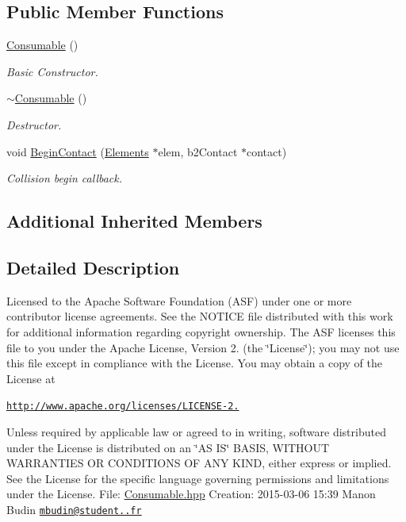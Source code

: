 \subsection*{Public Member Functions}
\begin{DoxyCompactItemize}
\item 
\hyperlink{class_consumable_ae374944f6333618dd08318b98b6950c7}{Consumable} ()
\begin{DoxyCompactList}\small\item\em Basic Constructor. \end{DoxyCompactList}\item 
\hyperlink{class_consumable_aed7671d58f80f5244e5851f591e4b8a2}{$\sim$\-Consumable} ()
\begin{DoxyCompactList}\small\item\em Destructor. \end{DoxyCompactList}\item 
void \hyperlink{class_consumable_adb866e69c3796edffad832b88e527518}{Begin\-Contact} (\hyperlink{class_elements}{Elements} $\ast$elem, b2\-Contact $\ast$contact)
\begin{DoxyCompactList}\small\item\em Collision begin callback. \end{DoxyCompactList}\end{DoxyCompactItemize}
\subsection*{Additional Inherited Members}


\subsection{Detailed Description}
Licensed to the Apache Software Foundation (A\-S\-F) under one or more contributor license agreements. See the N\-O\-T\-I\-C\-E file distributed with this work for additional information regarding copyright ownership. The A\-S\-F licenses this file to you under the Apache License, Version 2. (the \char`\"{}\-License\char`\"{}); you may not use this file except in compliance with the License. You may obtain a copy of the License at

\href{http://www.apache.org/licenses/LICENSE-2.0}{\tt http\-://www.\-apache.\-org/licenses/\-L\-I\-C\-E\-N\-S\-E-\/2.}

Unless required by applicable law or agreed to in writing, software distributed under the License is distributed on an \char`\"{}\-A\-S I\-S\char`\"{} B\-A\-S\-I\-S, W\-I\-T\-H\-O\-U\-T W\-A\-R\-R\-A\-N\-T\-I\-E\-S O\-R C\-O\-N\-D\-I\-T\-I\-O\-N\-S O\-F A\-N\-Y K\-I\-N\-D, either express or implied. See the License for the specific language governing permissions and limitations under the License. File\-: \hyperlink{_consumable_8hpp}{Consumable.\-hpp} Creation\-: 2015-\/03-\/06 15\-:39 Manon Budin \href{mailto:mbudin@student.42.fr}{\tt mbudin@student..\-fr} 

